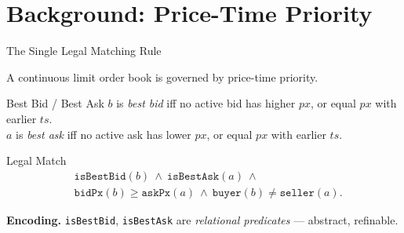 \section{Background: Price-Time Priority}

\begin{frame}{The Single Legal Matching Rule}

A continuous limit order book is governed by \alert{price-time priority}.

\begin{block}{Best Bid / Best Ask}
$b$ is \emph{best bid} iff no active bid has higher $px$, or equal $px$ with earlier $ts$.\\
$a$ is \emph{best ask} iff no active ask has lower $px$, or equal $px$ with earlier $ts$.
\end{block}

\begin{block}{Legal Match}
\[
\begin{aligned}
  & \texttt{isBestBid}(b)\ \wedge\ \texttt{isBestAsk}(a)\ \wedge \\
  & \texttt{bidPx}(b) \geq \texttt{askPx}(a)\ \wedge\ \texttt{buyer}(b) \neq \texttt{seller}(a).
\end{aligned}
\]
\end{block}

\textbf{Encoding.} \texttt{isBestBid}, \texttt{isBestAsk} are \emph{relational predicates} --- abstract, refinable.

\end{frame}

